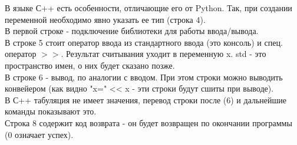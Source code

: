 \begin{lecture}[\lectureSubject]
\begin{lecSection}[Синтаксис]
		В языке С++ есть особенности, отличающие его от Python. Так, при создании переменной необходимо явно указать ее тип (строка 4).\\
		В первой строке - подключение библиотеки для работы ввода/вывода.\\
		В строке 5 стоит оператор ввода из стандартного ввода (это консоль) и спец. оператор $>>$. Результат считывания уходит в переменную x. std - это пространство имен, о них будет сказано позже. \\
		В строке 6 - вывод, по аналогии с вводом. При этом строки можно выводить конвейером (как видно "x=" << x - эти строки будут сшиты при выводе).\\
		В С++ табуляция не имеет значения, перевод строки после (6) и дальнейшие команды показывают это. \\
		Строка 8 содержит код возврата - он будет возвращен по окончании программы (0 означает успех).
		 

\end{lecSection}
\end{lecture}
